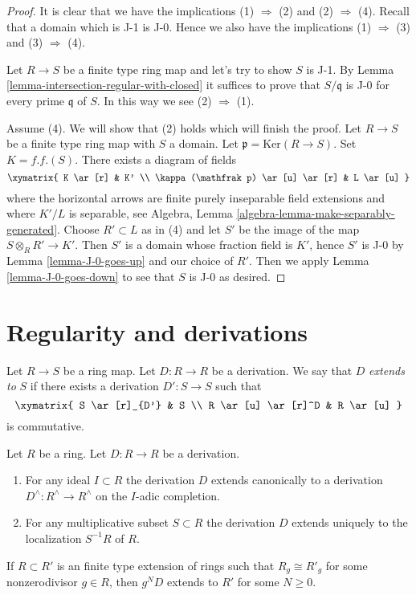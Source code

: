 \begin{proof}
It is clear that we have the implications (1) $\Rightarrow$ (2) and
(2) $\Rightarrow$ (4). Recall that a domain which is
J-1 is J-0. Hence we also have the implications
(1) $\Rightarrow$ (3) and (3) $\Rightarrow$ (4).

\medskip\noindent
Let $R \to S$ be a finite type ring map and let's try to show $S$ is J-1. By
Lemma \ref{lemma-intersection-regular-with-closed} it suffices
to prove that $S/\mathfrak q$ is J-0 for every prime $\mathfrak q$
of $S$. In this way we see (2) $\Rightarrow$ (1).

\medskip\noindent
Assume (4). We will show that (2) holds which will finish the proof.
Let $R \to S$ be a finite type ring map with $S$ a domain.
Let $\mathfrak p = \text{Ker}(R \to S)$. Set $K = f.f.(S)$. There exists
a diagram of fields
$$
\xymatrix{
K \ar[r] & K' \\
\kappa(\mathfrak p) \ar[u] \ar[r] & L \ar[u]
}
$$
where the horizontal arrows are finite purely inseparable field extensions
and where $K'/L$ is separable, see
Algebra, Lemma \ref{algebra-lemma-make-separably-generated}.
Choose $R' \subset L$ as in (4) and let
$S'$ be the image of the map $S \otimes_R R' \to K'$.
Then $S'$ is a domain whose fraction field is $K'$, hence
$S'$ is J-0 by Lemma \ref{lemma-J-0-goes-up} and our choice of $R'$.
Then we apply Lemma \ref{lemma-J-0-goes-down} to see that $S$
is J-0 as desired.
\end{proof}



\section{Regularity and derivations}
\label{section-regularity-derivations}

\noindent
Let $R \to S$ be a ring map. Let $D : R \to R$ be a derivation.
We say that $D$ {\it extends to} $S$
if there exists a derivation $D' : S \to S$ such that
$$
\xymatrix{
S \ar[r]_{D'} & S \\
R \ar[u] \ar[r]^D & R \ar[u]
}
$$
is commutative.

\begin{lemma}
\label{lemma-derivation-extends}
Let $R$ be a ring. Let $D : R \to R$ be a derivation.
\begin{enumerate}
\item For any ideal $I \subset R$ the derivation $D$ extends
canonically to a derivation $D^\wedge : R^\wedge \to R^\wedge$
on the $I$-adic completion.
\item For any multiplicative subset $S \subset R$ the derivation
$D$ extends uniquely to the localization $S^{-1}R$ of $R$.
\end{enumerate}
If $R \subset R'$ is an finite type extension of rings such that
$R_g \cong R'_g$ for some nonzerodivisor $g \in R$, then $g^ND$ extends
to $R'$ for some $N \geq 0$.
\end{lemma}

